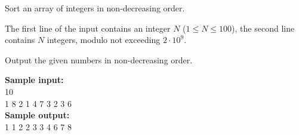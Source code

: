 \documentclass[a4paper]{article}
\begin{document}
Sort an array of integers in non-decreasing order.

The first line of the input contains an integer $N$ ($1 \le N \le 100$), the second line contains $N$ integers, modulo not exceeding $2 \cdot 10^9$.

Output the given numbers in non-decreasing order.

\LINE

\noindent \textbf{Sample input:}\\
10\\
1 8 2 1 4 7 3 2 3 6\\


\noindent \textbf{Sample output:}\\
1 1 2 2 3 3 4 6 7 8
\end{document}

